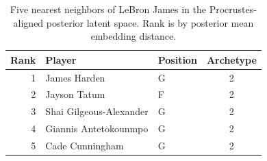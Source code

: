 \begin{table}[htbp]
  \centering\small
  \begin{tabular}{rllc}
    \toprule
    Rank & Player & Position & Archetype \\
    \midrule
    1 & James Harden & G & 2 \\
    2 & Jayson Tatum & F & 2 \\
    3 & Shai Gilgeous-Alexander & G & 2 \\
    4 & Giannis Antetokounmpo & G & 2 \\
    5 & Cade Cunningham & G & 2 \\
    \bottomrule
  \end{tabular}
  \caption{Five nearest neighbors of LeBron James in the Procrustes-aligned posterior latent space. Rank is by posterior mean embedding distance.}
  \label{tab:LeBron_James_neighbors}
\end{table}

